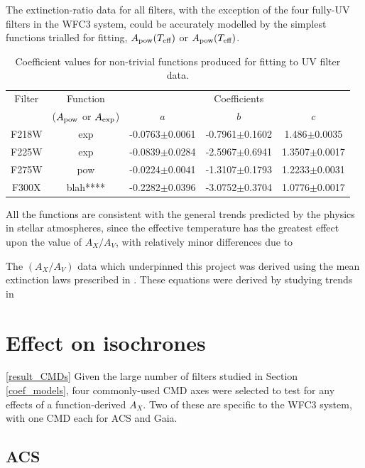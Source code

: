 \documentclass[12pt, a4paper]{report}
\begin{document}
The extinction-ratio data for all filters, with the exception of the four fully-UV filters in the WFC3 system, could be accurately modelled by the simplest functions trialled for fitting, $A_{\textnormal{pow}} (T_{\textnormal{eff}})$ or $A_{\textnormal{pow}} (T_{\textnormal{eff}})$.
\begin{table}
\begin{center}
\begin{tabular}{ccccc}
\hline

Filter &  Function & & Coefficients & \\
 & ($A_{\textnormal{pow}}$ or $A_{\textnormal{exp}}$) & $a$ & $b$ & $c$ \\
\hline
F218W & exp & -0.0763$\pm$0.0061 & -0.7961$\pm$0.1602 & 1.486$\pm$0.0035 \\
F225W & exp & -0.0839$\pm$0.0284 & -2.5967$\pm$0.6941 & 1.3507$\pm$0.0017 \\
F275W & pow & -0.0224$\pm$0.0041 & -1.3107$\pm$0.1793 & 1.2233$\pm$0.0031 \\
F300X & blah**** & -0.2282$\pm$0.0396 & -3.0752$\pm$0.3704 & 1.0776$\pm$0.0017 \\
\hline
\end{tabular}
\caption{Coefficient values for non-trivial functions produced for fitting to UV filter data.}
\label{UV_coeffs_table}
\end{center}
\end{table}

All the functions are consistent with the general trends predicted by the physics in stellar atmospheres, since the effective temperature has the greatest effect upon the value of $A_{X}/A_{V}$, with relatively minor differences due to 

The $(A_{X}/A_{V})$ data which underpinned this project was derived using the mean extinction laws prescribed in \cite{1989ApJ...345..245C}. These equations were derived by studying trends in 

\section{Effect on isochrones} \ref{result_CMDs}
Given the large number of filters studied in Section \ref{coef_models}, four commonly-used CMD axes were selected to test for any effects of a function-derived $A_{X}$. Two of these are specific to the WFC3 system, with one CMD each for ACS and Gaia.
\subsection{ACS} \label{ACS_isoc}
\end{document}

